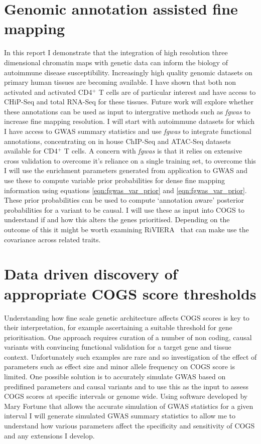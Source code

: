 \documentclass[a4paper,11pt]{report}
\begin{document}
\section{Genomic annotation assisted fine mapping} 
In this report I demonstrate that the integration of high resolution three dimensional chromatin maps with genetic data can inform the biology of autoimmune disease susceptibility. Increasingly high quality genomic datasets on primary human tissues are becoming available. I have shown that both non activated and activated CD4$^{+}$ T cells are of particular interest and  have access to CHiP-Seq and total RNA-Seq for these tissues. Future work will explore whether these annotations can be used as input to intergrative methods such as \textit{fgwas} to increase fine mapping resolution. I will start with autoimmune datasets for which I have access to GWAS summary statistics and use \textit{fgwas} to integrate functional annotations, concentrating on in house ChIP-Seq and ATAC-Seq datasets available for CD4$^{+}$ T cells. A concern with \textit{fgwas} is that it relies on extensive cross validation to overcome it's reliance on a single training set, to overcome this I will use the enrichment parameters generated from application to GWAS and use these to compute variable prior probabilities for dense fine mapping information using equations \ref{eqn:fgwas_var_prior} and \ref{eqn:fgwas_var_prior}. These  prior probabilities can be used to compute `annotation aware' posterior probabilities for a variant to be causal. I will use these as input into COGS to understand if and how this alters the genes prioritised. Depending on the outcome of this it might be worth examining RiVIERA~\citep{LiKellis2016} that can make use the covariance across related traits.


\section{Data driven discovery of appropriate COGS score thresholds}
\label{sect:gwassim}
Understanding how fine scale genetic architecture affects COGS scores is key to their interpretation, for example ascertaining a suitable threshold for gene prioritisation. One approach requires curation of a number of non coding,  causal variants with convincing functional validation for a target gene and tissue context. Unfortunately such examples are rare and so investigation of the effect of parameters such as effect size and minor allele frequency on COGS score is limited. One possible solution is to accurately simulate GWAS based on predifined parameters and causal variants and to use this as the input to assess COGS scores at specific intervals or genome wide. Using software developed by Mary Fortune that allows the accurate simulation of GWAS statistics for a given interval I will generate simulated GWAS summary statistics to allow me to understand how various parameters affect the specificity and sensitivity of COGS and any extensions I develop.
\end{document}
